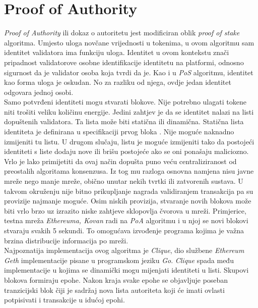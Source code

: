 \documentclass[times, utf8, zavrsni, numeric]{fer}
\begin{document}
\section{Proof of Authority}
\emph{Proof of Authority} ili dokaz o autoritetu jest modificiran oblik \emph{proof of stake} algoritma. Umjesto uloga novčane vrijednosti u tokenima, u ovom algoritmu
sam identitet validatora ima funkciju uloga. Identitet u ovom kontekstu znači pripadnost validatorove osobne identifikacije identitetu na platformi, odnosno
sigurnost da je validator osoba koja tvrdi da je. Kao i u \emph{PoS} algoritmu, identitet kao forma uloga je oskudan. No za razliku od njega, ovdje jedan identitet odgovara
jednoj osobi.\citep{poa1} \\
Samo potvrđeni identiteti mogu stvarati blokove. Nije potrebno ulagati tokene niti trošiti veliku količinu energije. Jedini zahtjev je da se identitet nalazi na listi
dopuštenih validatora. Ta lista može biti statična ili dinamična. Statična lista identiteta je definirana u specifikaciji prvog bloka . Nije moguće naknadno
izmijeniti tu listu. U drugom slučaju, listu je moguće izmijeniti tako da postojeći identiteti s liste dodaju nove ili brišu postojeće ako se oni ponašaju maliciozno.\citep{poa2} \\
Vrlo je lako primijetiti da ovaj način dopušta puno veću centraliziranost od preostalih algoritama konsenzusa. Iz tog mu razloga osnovna namjena nisu javne mreže nego manje mreže,
obično unutar nekih tvrtki ili zatvorenih sustava. U takvom okruženju nije bitno prikupljanje nagrada validiranjem transakcija pa su provizije najmanje moguće.
Osim niskih provizija, stvaranje novih blokova može biti vrlo brzo uz izrazito niske zahtjeve sklopovlja čvorova u mreži. Primjerice, testna mreža \emph{Ethereuma, Kovan}
radi na \emph{PoA} algoritmu i u njoj se novi blokovi stvaraju svakih 5 sekundi. To omogućava izvođenje programa kojima je važna brzina distribucije informacija po mreži. \\
Najpoznatija implementacija ovog algoritma je \emph{Clique}, dio službene \emph{Ethereum Geth} implementacije pisane u programskom jeziku \emph{Go}.
\emph{Clique} spada među implementacije u kojima se dinamički mogu mijenjati identiteti u listi. Skupovi blokova formiraju epohe. Nakon kraja svake epohe se objavljuje
poseban tranzicijski blok čiji je sadržaj nova lista autoriteta koji će imati ovlasti potpisivati i transakcije u idućoj epohi.
\end{document}
